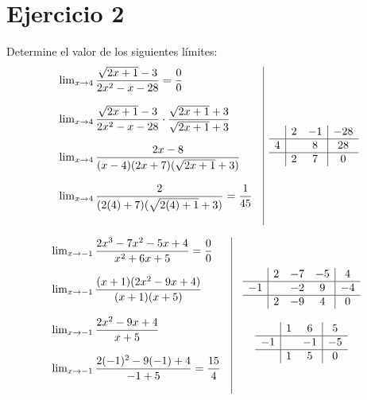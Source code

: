 \documentclass[12pt]{article}
\begin{document}
\newpage
\section*{Ejercicio 2}
\noindent Determine el valor de los siguientes límites:
\[
\begin{array}{l|c}
  \begin{array}{l}
    \lim_{x \to 4} \dfrac{\sqrt{2x+1} - 3}{2x^2-x-28} = \dfrac{0}{0} \\\\
    \lim_{x \to 4} \dfrac{\sqrt{2x+1}-3}{2x^2-x-28} \cdot \dfrac{\sqrt{2x+1}+3}{\sqrt{2x+1}+3} \\\\
    \lim_{x \to 4} \dfrac{2x-8}{(x-4)(2x+7)(\sqrt{2x+1}+3)} \\\\
    \lim_{x \to 4} \dfrac{2}{(2(4)+7)(\sqrt{2(4)+1}+3)} = \dfrac{1}{45} \\\\
  \end{array}
  &
  \begin{array}{c|c c|c}
    & 2 & -1 & -28 \\
    \hline
    4 &  & 8  & 28 \\
    \hline
    & 2 & 7  & 0 \\
  \end{array}
\end{array}
\]

\[
\begin{array}{l|c}
  \begin{array}{l}
    \lim_{x \to -1} \dfrac{2x^3 - 7x^2 - 5x + 4}{x^2 + 6x + 5} = \dfrac{0}{0} \\\\
    \lim_{x \to -1} \dfrac{(x+1)(2x^2 - 9x + 4)}{(x+1)(x+5)} \\\\
    \lim_{x \to -1} \dfrac{2x^2 - 9x + 4}{x+5} \\\\
    \lim_{x \to -1} \dfrac{2(-1)^2 - 9(-1) + 4}{-1 + 5} = \dfrac{15}{4} \\\\
  \end{array}
  &
  \begin{array}{c}
    \begin{array}{c|c c c|c}
      & 2 & -7 & -5 & 4 \\
      \hline
      -1 &  & -2 & 9 & -4 \\
      \hline
      & 2 & -9 & 4 & 0 \\
    \end{array} \\\\
    \begin{array}{c|c c|c}
      & 1 & 6 & 5 \\
      \hline
      -1 &  & -1 & -5 \\
      \hline
      & 1 & 5 & 0 \\
    \end{array}
  \end{array}
\end{array}
\]
\end{document}
